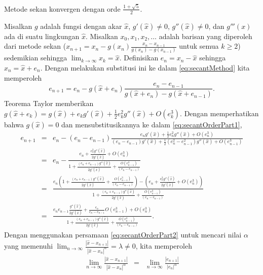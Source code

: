 \begin{digression}{Metode sekan konvergen dengan orde $\frac{1+\sqrt{5}}{2}$.}

\noindent{}Misalkan $g$ adalah fungsi
dengan akar $\hat{x}$, $g'(\hat{x})\neq0$, $g''(\hat{x})\neq0$,
dan $g'''(x)$ ada di suatu lingkungan $\hat{x}$. Misalkan $x_{0},x_{1},x_{2},\ldots$
adalah barisan yang diperoleh dari metode sekan ($x_{n+1}=x_{n}-g(x_{n})\frac{x_{n}-x_{n-1}}{g(x_{n})-g(x_{n-1})}$
untuk semua $k\geq2$) sedemikian sehingga ${\displaystyle \lim_{k\to\infty}x_{k}=\hat{x}}$.
Definisikan $e_{n}=x_{n}-\hat{x}$ sehingga $x_{n}=\hat{x}+e_{n}$.
Dengan melakukan substitusi ini ke dalam \ref{eq:secantMethod} kita
memperoleh 
\begin{equation}
e_{n+1}=e_{n}-g(\hat{x}+e_{n})\frac{e_{n}-e_{n-1}}{g(\hat{x}+e_{n})-g(\hat{x}+e_{n-1})}.\label{eq:secantOrderPart1}
\end{equation}
Teorema Taylor memberikan $g(\hat{x}+e_{k})=g(\hat{x})+e_{k}g'(\hat{x})+\frac{1}{2}e_{k}^{2}g''(\hat{x})+O(e_{k}^{3})$.
Dengan memperhatikan bahwa $g(\hat{x})=0$ dan mensubstitusikannya
ke dalam \ref{eq:secantOrderPart1},
\begin{eqnarray}
e_{n+1} & = & e_{n}-(e_{n}-e_{n-1})\frac{e_{n}g'(\hat{x})+\frac{1}{2}e_{n}^{2}g''(\hat{x})+O(e_{n}^{3})}{(e_{n}-e_{n-1})g'(\hat{x})+\frac{1}{2}(e_{n}^{2}-e_{n-1}^{2})g''(\hat{x})+O(e_{n-1}^{3})}\nonumber \\
 & = & e_{n}-\frac{e_{n}+\frac{e_{n}^{2}g''(\hat{x})}{2g'(\hat{x})}+O(e_{n}^{3})}{1+\frac{(e_{n}+e_{n-1})g''(\hat{x})}{2g'(\hat{x})}+\frac{O(e_{n-1}^{3})}{(e_{n}-e_{n-1})}}\nonumber \\
 & = & \frac{e_{n}\left(1+\frac{(e_{n}+e_{n-1})g''(\hat{x})}{2g'(\hat{x})}+\frac{O(e_{n-1}^{3})}{(e_{n}-e_{n-1})}\right)-\left(e_{n}+\frac{e_{n}^{2}g''(\hat{x})}{2g'(\hat{x})}+O(e_{n}^{3})\right)}{1+\frac{(e_{n}+e_{n-1})g''(\hat{x})}{2g'(\hat{x})}+\frac{O(e_{n-1}^{3})}{(e_{n}-e_{n-1})}}\nonumber \\
 & = & \frac{e_{n}e_{n-1}\frac{g''(\hat{x})}{2g'(\hat{x})}+\frac{e_{n}}{e_{n}-e_{n-1}}O(e_{n-1}^{3})+O(e_{n}^{3})}{1+\frac{(e_{n}+e_{n-1})g''(\hat{x})}{2g'(\hat{x})}+\frac{O(e_{n-1}^{3})}{(e_{n}-e_{n-1})}}.\label{eq:secantOrderPart2}
\end{eqnarray}
Dengan menggunakan persamaan \ref{eq:secantOrderPart2} untuk mencari
nilai $\alpha$ yang memenuhi $\lim_{n\to\infty}\frac{|\hat{x}-x_{n+1}|}{|\hat{x}-x_{n}|^{\alpha}}=\lambda\neq0$,
kita memperoleh
\begin{eqnarray*}
\lim_{n\to\infty}\frac{|\hat{x}-x_{n+1}|}{|\hat{x}-x_{n}|^{\alpha}} & = & \lim_{n\to\infty}\frac{|e_{n+1}|}{|e_{n}|^{\alpha}}\\

\end{eqnarray*}
\end{digression}
